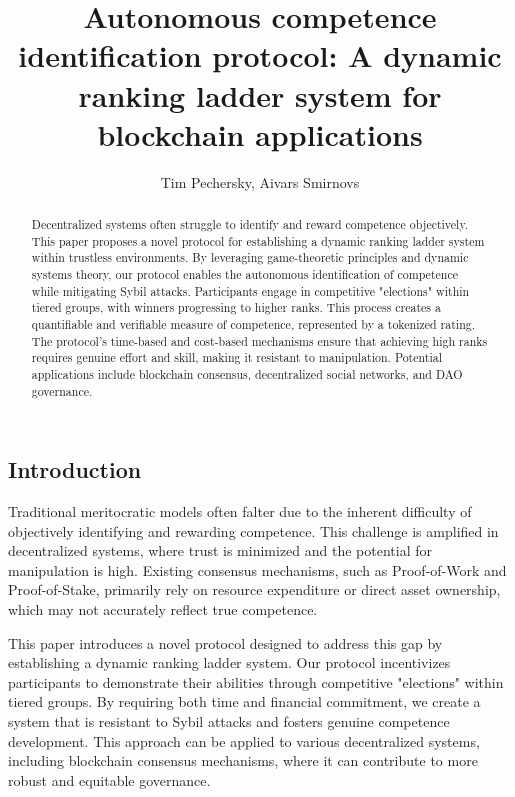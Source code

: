 \documentclass{article}
\title{Autonomous competence identification protocol: A dynamic ranking ladder system for blockchain applications}
\author{Tim Pechersky, Aivars Smirnovs}
\begin{document}
\begin{CJK}{UTF8}{gbsn}

    \maketitle


    \begin{abstract}
        Decentralized systems often struggle to identify and reward competence objectively. This paper proposes a novel protocol for establishing a dynamic ranking ladder system within trustless environments. By leveraging game-theoretic principles and dynamic systems theory, our protocol enables the autonomous identification of competence while mitigating Sybil attacks. Participants engage in competitive "elections" within tiered groups, with winners progressing to higher ranks. This process creates a quantifiable and verifiable measure of competence, represented by a tokenized rating. The protocol's time-based and cost-based mechanisms ensure that achieving high ranks requires genuine effort and skill, making it resistant to manipulation.  Potential applications include blockchain consensus, decentralized social networks, and DAO governance.
    \end{abstract}

    \section{Introduction}

    Traditional meritocratic models often falter due to the inherent difficulty of objectively identifying and rewarding competence.\cite{Arrow2000} This challenge is amplified in decentralized systems, where trust is minimized and the potential for manipulation is high. Existing consensus mechanisms, such as Proof-of-Work and Proof-of-Stake, primarily rely on resource expenditure or direct asset ownership, which may not accurately reflect true competence.

    This paper introduces a novel protocol designed to address this gap by establishing a dynamic ranking ladder system. Our protocol incentivizes participants to demonstrate their abilities through competitive "elections" within tiered groups. By requiring both time and financial commitment, we create a system that is resistant to Sybil attacks and fosters genuine competence development. This approach can be applied to various decentralized systems, including blockchain consensus mechanisms, where it can contribute to more robust and equitable governance.


\end{CJK}
\end{document}
